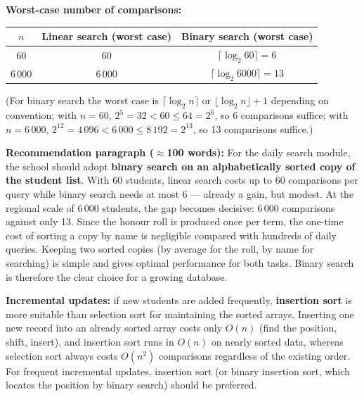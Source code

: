 \documentclass[11pt]{article}
\begin{document}
\begin{exemplebox}
\textbf{Worst-case number of comparisons:}
\begin{center}
\begin{tabular}{|c|c|c|}
\hline
\rowcolor{popblueL}$n$ & Linear search (worst case) & Binary search (worst case) \\
\hline
60 & 60 & $\lceil \log_2 60 \rceil = 6$ \\
6\,000 & 6\,000 & $\lceil \log_2 6000 \rceil = 13$ \\
\hline
\end{tabular}
\end{center}
(For binary search the worst case is $\lceil \log_2 n \rceil$ or $\lfloor \log_2 n \rfloor + 1$ depending on convention; with $n=60$, $2^5 = 32 < 60 \le 64 = 2^6$, so 6 comparisons suffice; with $n = 6\,000$, $2^{12} = 4\,096 < 6\,000 \le 8\,192 = 2^{13}$, so 13 comparisons suffice.)

\medskip
\noindent\textbf{Recommendation paragraph ($\approx$100 words):}
For the daily search module, the school should adopt \textbf{binary search on an alphabetically sorted copy of the student list}. With 60 students, linear search costs up to 60 comparisons per query while binary search needs at most 6 — already a gain, but modest. At the regional scale of 6\,000 students, the gap becomes decisive: 6\,000 comparisons against only 13. Since the honour roll is produced once per term, the one-time cost of sorting a copy by name is negligible compared with hundreds of daily queries. Keeping two sorted copies (by average for the roll, by name for searching) is simple and gives optimal performance for both tasks. Binary search is therefore the clear choice for a growing database.

\medskip
\noindent\textbf{Incremental updates:} if new students are added frequently, \textbf{insertion sort} is more suitable than selection sort for maintaining the sorted arrays. Inserting one new record into an already sorted array costs only $O(n)$ (find the position, shift, insert), and insertion sort runs in $O(n)$ on nearly sorted data, whereas selection sort always costs $O(n^2)$ comparisons regardless of the existing order. For frequent incremental updates, insertion sort (or binary insertion sort, which locates the position by binary search) should be preferred.
\end{exemplebox}
\end{document}
